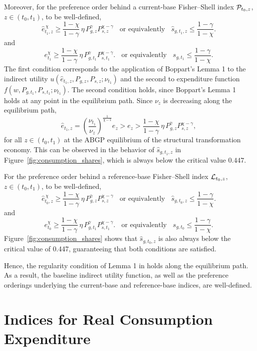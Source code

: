\documentclass[12pt,a4paper]{article}
\begin{document}
\begin{appendices}
Moreover, for the preference order behind a current-base Fisher–Shell index ${\cal P}_{t_0,z}$, $z\in(t_0,t_1)$, to be well-defined, 
\[
\widehat e_{t_1,z}^{\,\chi} \geq \frac{1 - \chi}{1 - \gamma} \, \eta \, P_{g,z}^\gamma P_{s,z}^{\chi - \gamma} 
\ \ \ \ \text{or equivalently}\ \ \ \ 
\widehat s_{g,t_1,z} \leq \frac{1 - \gamma}{1 - \chi} .
\]
and
\[
e_{t_1}^{\chi} \geq \frac{1 - \chi}{1 - \gamma} \, \eta \, P_{g,{t_1}}^\gamma P_{s,{t_1}}^{\chi - \gamma} .
\ \ \ \ \text{or equivalently}\ \ \ \ 
s_{g,t_1} \leq \frac{1 - \gamma}{1 - \chi} .
\]
The first condition corresponds to the application of Boppart's Lemma 1 to the indirect utility  $u(\widehat e_{t_1,z},P_{g,z},P_{s,z};\nu_{t_1})$ and the second to expenditure function $f(w,P_{g,t_1},P_{s,t_1};\nu_{t_1})$.
The second condition holds, since Boppart's Lemma 1 holds at any point in the equilibrium path.
Since $\nu_z$ is decreasing along the equilibrium path,
\[
\widehat e_{t_1,z} = \left(\frac{\nu_{t_1}}{\nu_z}\right)^{\frac{1}{\chi-1}} e_z >  e_z >  \frac{1 - \chi}{1 - \gamma} \, \eta \, P_{g,z}^\gamma P_{s,z}^{\chi - \gamma}  ,
\]
for all $z\in(t_0,t_1)$ at the ABGP equilibrium of the structural transformation economy.
This can be observed in the behavior of $\widehat s_{g,t_1,z}$ in Figure~\ref{fig:consumption_shares}, which is always below the critical value $0.447$.


For the preference order behind a reference-base Fisher–Shell index ${\cal L}_{t_0,z}$, $z\in(t_0,t_1)$, to be well-defined, 
\[
\widehat e_{t_0,z}^{\,\chi} \geq \frac{1 - \chi}{1 - \gamma} \, \eta \, P_{g,z}^\gamma P_{s,z}^{\chi - \gamma} 
\ \ \ \ \text{or equivalently}\ \ \ \ 
\widehat s_{g,t_0,z} \leq \frac{1 - \gamma}{1 - \chi} .
\]
and
\[
e_{t_0}^{\chi} \geq \frac{1 - \chi}{1 - \gamma} \, \eta \, P_{g,{t_1}}^\gamma P_{s,{t_1}}^{\chi - \gamma} .
\ \ \ \ \text{or equivalently}\ \ \ \ 
s_{g,t_0} \leq \frac{1 - \gamma}{1 - \chi} .
\]
Figure~\ref{fig:consumption_shares} shows that $\widehat s_{g,t_0,z}$ is also always below the critical value of 0.447, guaranteeing that both conditions are satisfied.

Hence, the regularity condition of Lemma 1 in \citet{Boppart_2014} holds along the equilibrium path. As a result, the baseline indirect utility function, as well as the preference orderings underlying the current-base and reference-base indices, are well-defined.

\section{Indices for Real Consumption Expenditure}


\end{appendices}
\end{document}
